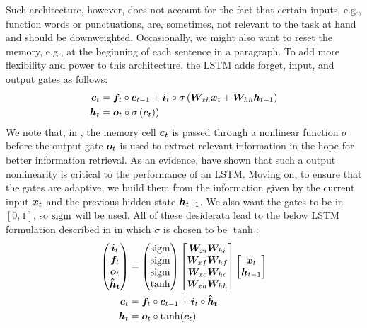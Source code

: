 Such architecture, however, does not account for the fact that certain inputs,
e.g., function words or punctuations,
are, sometimes, not relevant to the task at hand and should be downweighted.
Occasionally, we might also want
to reset the memory, e.g., at the beginning of each sentence in a
paragraph. To add more flexibility and power to this architecture, the LSTM adds
forget, input, and output gates as follows:
\begin{align}
\bm{c}_{t} &= \bm{f}_{t} \circ \bm{c}_{t-1} + \bm{i}_{t} \circ \sigma\left(\bm{W}_{xh}\bm{x}_{t} +
\bm{W}_{hh}\bm{h}_{t-1}\right) \\
\bm{h}_{t} &= \bm{o}_{t} \circ \sigma\left(\bm{c}_{t}\right) \label{e:lstm_output})
\end{align}
We note that, in , 
the memory cell $\bm{c}_{t}$ is passed through a nonlinear function $\sigma$ before the output
gate $\bm{o}_{t}$ is used to extract relevant information in the hope for better
information retrieval.
As an evidence,  have
shown that such a output nonlinearity is critical to the performance of an LSTM. Moving on, to ensure that the
gates are adaptive, we build them from the information given by the current
input $\bm{x}_{t}$ and the previous hidden state $\bm{h}_{t-1}$. We also want the gates to be in $[0, 1]$,
so $\operatorname{sigm}$ will be used. All
of these desiderata lead to the below LSTM formulation described in
\cite{zaremba14} in which $\sigma$ is chosen to be $\tanh$:
\begin{align}
\begin{pmatrix}
\bm{i}_{t} \\
\bm{f}_{t} \\
\bm{o}_{t} \\
\mbox{\boldmath{$\hat{h}_t$}}
\end{pmatrix}
&= 
\begin{pmatrix}
\operatorname{sigm} \\
\operatorname{sigm} \\
\operatorname{sigm} \\
\tanh
\end{pmatrix}
\begin{bmatrix}
\bm{W}_{xi} \bm{W}_{hi} \\
\bm{W}_{xf} \bm{W}_{hf} \\
\bm{W}_{xo} \bm{W}_{ho} \\
\bm{W}_{xh} \bm{W}_{hh}
\end{bmatrix}
\begin{bmatrix}
  \bm{x}_{t} \\
  \bm{h}_{t-1}
\end{bmatrix} \label{e:lstm_detailed}\\
\bm{c}_{t} &= \bm{f}_{t} \circ \bm{c}_{t-1} + \bm{i}_{t} \circ \mbox{\boldmath{$\hat{h}_t$}} \label{e:lstm_cell}\\
\bm{h}_{t} &= \bm{o}_{t} \circ \tanh(\bm{c}_{t}) \label{e:lstm_detailed_output}
\end{align}

